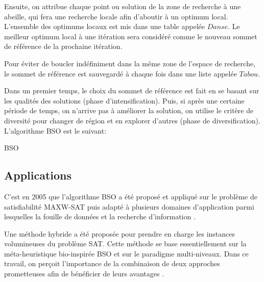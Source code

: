 Ensuite, on attribue chaque point ou solution de la zone de recherche à une abeille, qui fera une recherche locale afin d’aboutir à un optimum local. L'ensemble des optimums locaux est mis dans une table appelée $Danse$. Le meilleur optimum local à une itération sera considéré comme le nouveau sommet de référence de la prochaine itération.

Pour éviter de boucler indéfiniment dans la même zone de
l’espace de recherche, le sommet de référence est sauvegardé à chaque
fois dans une liste appelée $Tabou$.

Dans un premier temps, le choix du sommet de référence est fait en
se basant sur les qualités des solutions (phase d’intensification). Puis, si après
une certaine période de temps, on n'arrive pas à améliorer la solution, on
utilise le critère de diversité pour changer de région et en explorer d’autres (phase de diversification).\\

L’algorithme BSO est le suivant:

\begin{algorithm}
	\caption{BSO}
\end{algorithm}

\subsection{Applications}

C'est en 2005 que l’algorithme BSO a été proposé et appliqué sur le problème de satisfiabilité MAXW-SAT puis adapté à plusieurs domaines d’application parmi lesquelles la fouille de données et la recherche d’information \cite{DRIAS_SADEG_YAHI_2005}.

Une méthode hybride a été proposée pour prendre en charge les instances volumineuses du problème SAT.
Cette méthode se base essentiellement sur la méta-heuristique bio-inspirée BSO et sur le paradigme multi-niveaux. Dans ce travail, on perçoit l’importance de la combinaison de deux approches prometteuses afin de bénéficier de leurs avantages \cite{DJEFFAL_DRIAS_2013}.

